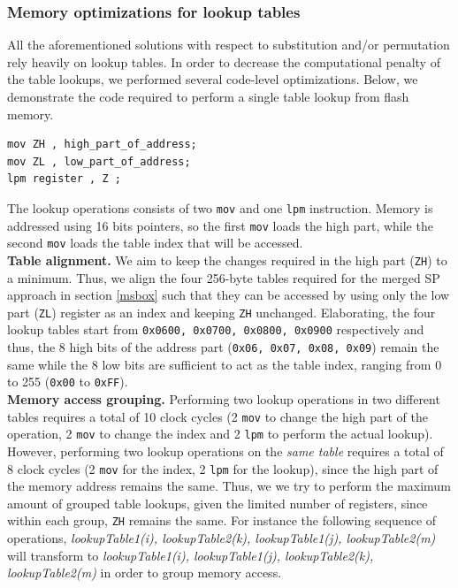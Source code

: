 \documentclass[11pt]{article}
\begin{document}
\subsubsection{Memory optimizations for lookup tables}
All the aforementioned solutions with respect to substitution and/or permutation rely heavily on lookup tables. In order to decrease the computational penalty of the table lookups, we performed several code-level optimizations. Below, we demonstrate the code required to perform a single table lookup from flash memory.
\begin{verbatim}
mov ZH , high_part_of_address; 
mov ZL , low_part_of_address; 
lpm register , Z ;
\end{verbatim}
The lookup operations consists of two \texttt{mov} and one \texttt{lpm} instruction. Memory is addressed using 16 bits pointers, so the first \texttt{mov} loads the high part, while the second \texttt{mov} loads the table index that will be accessed.\\
\textbf{Table alignment.} We aim to keep the changes required in the high part (\texttt{ZH}) to a minimum. Thus, we align the four 256-byte tables required for the merged SP approach in section \ref{msbox} such that they can be accessed by using only the  low part (\texttt{ZL}) register as an index and keeping \texttt{ZH} unchanged. Elaborating, the four lookup tables start from \texttt{0x0600, 0x0700, 0x0800, 0x0900} respectively and thus, the 8 high bits of the address part (\texttt{0x06, 0x07, 0x08, 0x09}) remain the same while the 8 low bits are sufficient to act as the table index, ranging from 0 to 255 (\texttt{0x00} to \texttt{0xFF}). \\
\textbf{Memory access grouping.} Performing two lookup operations in two different tables requires a total of 10 clock cycles (2 \texttt{mov} to change the high part of the operation, 2 \texttt{mov} to change the index and 2 \texttt{lpm} to perform the actual lookup). However, performing two lookup operations on the \emph{same table} requires a total of 8 clock cycles (2 \texttt{mov} for the index, 2 \texttt{lpm} for the lookup), since the high part of the memory address remains the same. Thus, we 
we try to perform the maximum amount of grouped table lookups, given the limited number of registers, since within each group, \texttt{ZH} remains the same. For instance the following sequence of operations, \emph{ lookupTable1(i), lookupTable2(k), lookupTable1(j), lookupTable2(m)} will transform to \emph{ lookupTable1(i), lookupTable1(j), lookupTable2(k), lookupTable2(m)} in order to group memory access.
\end{document}
